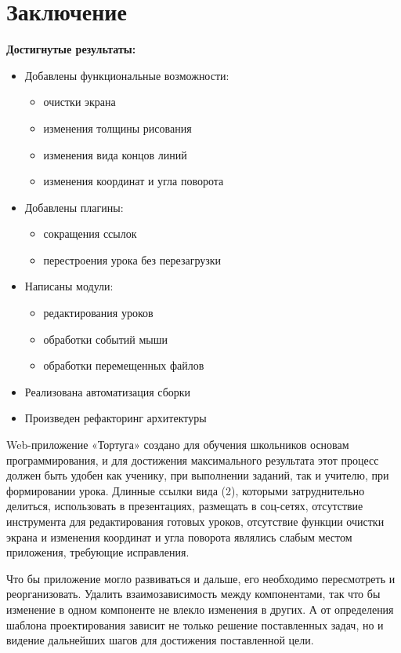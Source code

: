 \chapter*{Заключение}						%

\textbf{Достигнутые результаты:}
\begin{itemize}
  \item Добавлены функциональные возможности:
	\begin{itemize}
	  \item очистки экрана
	  \item изменения толщины рисования
	  \item изменения вида концов линий
	  \item изменения координат и угла поворота
	\end{itemize}
  \item Добавлены плагины:
  	\begin{itemize}
  	  \item сокращения ссылок
  	  \item перестроения урока без перезагрузки
  	\end{itemize}
  \item Написаны модули:
  	\begin{itemize}
  	  \item редактирования уроков
  	  \item обработки событий мыши
  	  \item обработки перемещенных файлов
  	\end{itemize}
  \item Реализована автоматизация сборки
  \item Произведен рефакторинг архитектуры
\end{itemize}
\vspace{10mm}

Web-приложение «Тортуга» создано для обучения школьников основам программирования, и для достижения максимального результата этот процесс должен быть удобен как ученику, при выполнении заданий, так и учителю, при формировании урока. Длинные ссылки вида (2), которыми затруднительно делиться, использовать в презентациях, размещать в соц-сетях, отсутствие инструмента для редактирования готовых уроков, отсутствие функции очистки экрана и изменения координат и угла поворота являлись слабым местом приложения, требующие исправления.\par

Что бы приложение могло развиваться и дальше, его необходимо пересмотреть и реорганизовать. Удалить взаимозависимость между компонентами, так что бы изменение в одном компоненте не влекло изменения в других. А от определения шаблона проектирования зависит не только решение поставленных задач, но и видение дальнейших шагов для достижения поставленной цели.\par

